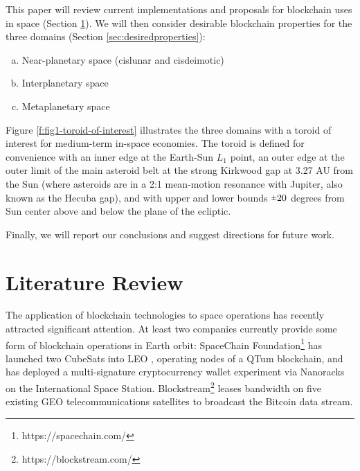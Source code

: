 \documentclass[]{aiaa-tc}%
\newcommand{\rpm}{\raisebox{.2ex}{$\scriptstyle\pm$}} %
\begin{document}
This paper will review current implementations and proposals for blockchain uses in space (Section \ref{sec:litreview}). We will then consider desirable blockchain properties for the three domains (Section \ref{sec:desiredproperties}): 
\begin{enumerate}[(a)] %
\item Near-planetary space (cislunar and cisdeimotic)
\item Interplanetary space
\item Metaplanetary space
\end{enumerate}

Figure \ref{f:fig1-toroid-of-interest} illustrates the three domains with a toroid of interest for medium-term in-space economies. The toroid is defined for convenience with an inner edge at the Earth-Sun $L_{1}$ point, an outer edge at the outer limit of the main asteroid belt at the strong Kirkwood gap at 3.27 AU from the Sun (where asteroids are in a 2:1 mean-motion resonance with Jupiter, also known as the Hecuba gap), and with upper and lower bounds $\rpm 20$ degrees from Sun center above and below the plane of the ecliptic.

Finally, we will report our conclusions and suggest directions for future work.


\section{Literature Review}\label{sec:litreview}

The application of blockchain technologies to space operations has recently attracted significant attention. At least two companies currently provide some form of blockchain operations in Earth orbit: SpaceChain Foundation\footnote{https://spacechain.com/} has launched two CubeSats into LEO
,
 operating nodes of a QTum blockchain, and has deployed a multi-signature cryptocurrency wallet experiment via Nanoracks on the International Space Station. Blockstream\footnote{https://blockstream.com/} leases bandwidth on five existing GEO telecommunications satellites to broadcast the Bitcoin data stream.
\end{document}
